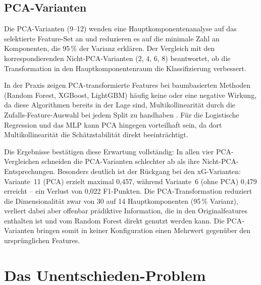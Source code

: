 \subsection{PCA-Varianten}

Die PCA-Varianten (9--12) wenden eine Hauptkomponentenanalyse auf das
selektierte Feature-Set an und reduzieren es auf die minimale Zahl an
Komponenten, die 95\,\% der Varianz erklären. Der Vergleich mit den
korrespondierenden Nicht-PCA-Varianten (2, 4, 6, 8) beantwortet, ob
die Transformation in den Hauptkomponentenraum die Klassifizierung
verbessert.

In der Praxis zeigen PCA-transformierte Features bei baumbasierten
Methoden (Random Forest, XGBoost, LightGBM) häufig keine oder
eine negative Wirkung, da diese Algorithmen bereits in der Lage sind,
Multikollinearität durch die Zufalls-Feature-Auswahl bei jedem Split
zu handhaben \cite{Breiman2001}. Für die Logistische Regression und
das MLP kann PCA hingegen vorteilhaft sein, da dort Multikollinearität
die Schätzstabilität direkt beeinträchtigt.

Die Ergebnisse bestätigen diese Erwartung vollständig: In allen vier
PCA-Vergleichen schneiden die PCA-Varianten schlechter ab als ihre
Nicht-PCA-Entsprechungen. Besonders deutlich ist der Rückgang bei den
xG-Varianten: Variante~11 (PCA) erzielt maximal 0,457, während Variante~6
(ohne PCA) 0,479 erreicht -- ein Verlust von 0,022 F1-Punkten. Die
PCA-Transformation reduziert die Dimensionalität zwar von 30 auf 14
Hauptkomponenten (95\,\% Varianz), verliert dabei aber offenbar prädiktive
Information, die in den Originalfeatures enthalten ist und vom Random
Forest direkt genutzt werden kann. Die PCA-Varianten bringen somit
in keiner Konfiguration einen Mehrwert gegenüber den ursprünglichen
Features.

\section{Das Unentschieden-Problem}
\label{sec:eval-draw}

